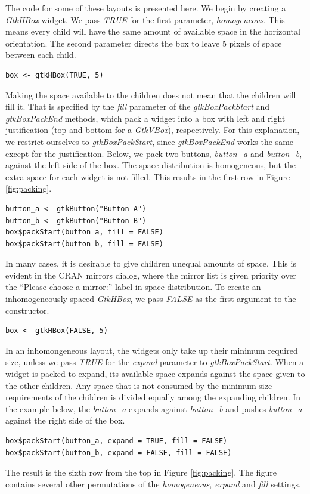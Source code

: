 \documentclass[article]{jss}
\begin{document}
The code for some of these layouts is presented here.
We begin by creating a \emph{GtkHBox} widget. We pass \emph{TRUE} for
the
first parameter, \emph{homogeneous}. This means every child will have
the
same amount of available space in the horizontal orientation. The
second 
parameter directs the box to leave 5 pixels of space between each
child. 
\begin{verbatim}
box <- gtkHBox(TRUE, 5)
\end{verbatim}
Making the space available to the children does not mean that the
children will fill it. That is specified by the \emph{fill} parameter
of the \emph{gtkBoxPackStart} and \emph{gtkBoxPackEnd} methods, which
pack a widget into a box with left and right justification (top and
bottom for a \emph{GtkVBox}), respectively. For this explanation, we
restrict ourselves to \emph{gtkBoxPackStart}, since
\emph{gtkBoxPackEnd} works the same except for the
justification. Below, we pack two buttons, \emph{button\_a} and
\emph{button\_b}, against the left side of the box. The space
distribution is homogeneous, but the extra space for each widget is
not filled. This results in the first row in Figure \ref{fig:packing}.
\begin{verbatim}
button_a <- gtkButton("Button A")
button_b <- gtkButton("Button B")
box$packStart(button_a, fill = FALSE)
box$packStart(button_b, fill = FALSE)
\end{verbatim}

In many cases, it is desirable to give children unequal amounts of
space.
This is evident in the CRAN mirrors dialog, where the mirror list is
given
priority over the ``Please choose a mirror:'' label in space
distribution.
To create an inhomogeneously spaced \emph{GtkHBox}, we pass
\emph{FALSE} as the first
argument to the constructor.
\begin{verbatim}
box <- gtkHBox(FALSE, 5)
\end{verbatim}
In an inhomongeneous layout, the widgets only take up their minimum
required
size, unless we pass \emph{TRUE} for the \emph{expand} parameter to
\emph{gtkBoxPackStart}. When a widget is packed to expand, its
available space
expands against the space given to the other children. Any space that
is
not consumed by the minimum size requirements of the children is
divided
equally among the expanding children. In the example below, the
\emph{button\_a}
expands against \emph{button\_b} and pushes \emph{button\_a} against
the right 
side of the box.
\begin{verbatim}
box$packStart(button_a, expand = TRUE, fill = FALSE)
box$packStart(button_b, expand = FALSE, fill = FALSE)
\end{verbatim}
The result is the sixth row from the top in Figure \ref{fig:packing}.
The
figure contains several other permutations of the \emph{homogeneous},
\emph{expand} 
and \emph{fill} settings.
\end{document}
